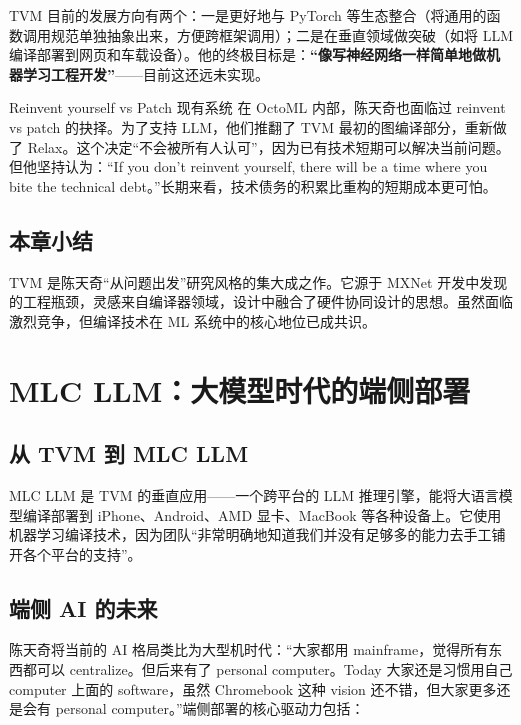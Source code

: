 \documentclass[a4paper]{article}
\begin{document}
TVM 目前的发展方向有两个：一是更好地与 PyTorch 等生态整合（将通用的函数调用规范单独抽象出来，方便跨框架调用）；二是在垂直领域做突破（如将 LLM 编译部署到网页和车载设备）。他的终极目标是：\textbf{``像写神经网络一样简单地做机器学习工程开发''}------目前这还远未实现。

\begin{warningbox}{Reinvent yourself vs Patch 现有系统}
在 OctoML 内部，陈天奇也面临过 reinvent vs patch 的抉择。为了支持 LLM，他们推翻了 TVM 最初的图编译部分，重新做了 Relax。这个决定``不会被所有人认可''，因为已有技术短期可以解决当前问题。但他坚持认为：``If you don't reinvent yourself, there will be a time where you bite the technical debt。''长期来看，技术债务的积累比重构的短期成本更可怕。
\end{warningbox}

\subsection{本章小结}

TVM 是陈天奇``从问题出发''研究风格的集大成之作。它源于 MXNet 开发中发现的工程瓶颈，灵感来自编译器领域，设计中融合了硬件协同设计的思想。虽然面临激烈竞争，但编译技术在 ML 系统中的核心地位已成共识。

\section{MLC LLM：大模型时代的端侧部署}

\subsection{从 TVM 到 MLC LLM}

MLC LLM 是 TVM 的垂直应用------一个跨平台的 LLM 推理引擎，能将大语言模型编译部署到 iPhone、Android、AMD 显卡、MacBook 等各种设备上。它使用机器学习编译技术，因为团队``非常明确地知道我们并没有足够多的能力去手工铺开各个平台的支持''。

\subsection{端侧 AI 的未来}

陈天奇将当前的 AI 格局类比为大型机时代：``大家都用 mainframe，觉得所有东西都可以 centralize。但后来有了 personal computer。Today 大家还是习惯用自己 computer 上面的 software，虽然 Chromebook 这种 vision 还不错，但大家更多还是会有 personal computer。''端侧部署的核心驱动力包括：
\end{document}
